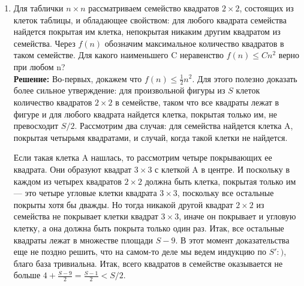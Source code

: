 \documentclass[a4paper,12pt]{article}
\begin{document}
\begin{enumerate}[label=\textbf{Задача \arabic*.}]
Что же нам дает равенство $3 = 3^2 + 1 \pmod{7}$? Просится от обоих частей взять функцию $f$, а затем воспользоваться условием задачи. Имеем: $f(3) = f((3^2+1) \pmod{7}) = (f(3)^2+1) \pmod{11}$. Чтобы подчеркнуть полученное, обозначим $f(3) = y$ и выбросим среднюю часть: $y = (y^2 + 1) \pmod{11}$. Отсюда следует $y^2 - y + 1 \equiv 0$ (в этом абзаце все сравнимости по модулю 11), отметим что это именно следствие а не равносильность. Выясним, имеет ли сравнимость решения, действуя стандартно $y \equiv \frac{1 \pm \sqrt{-3}}{2}$. А извлекается ли квадратиый корень из -3 по модулю 11? Заметим что $1^2 \equiv (-1)^2 \equiv 1$, $2^2 \equiv (-2)^2 \equiv 4$, $3^2 \equiv (-3)^2 \equiv 9$, $4^2 \equiv (-4)^2 \equiv 5$ и $5^2 \equiv (-5)^2 \equiv 3$. Мы перебрали все остатки, среди квадратов не нашлось -3, значит корень не извлекается, значит уравнение $y^2 - y + 1 \equiv 0$ не имеет решений.

Итак, требуемой функции $f$ не существует.

\item Для таблички $n\times n$ рассматриваем семейство квадратов $2 \times 2$, состоящих из клеток таблицы, и обладающее свойством: для любого квадрата семейства найдется покрытая им клетка, непокрытая никаким другим квадратом из семейства. Через $f(n)$ обозначим максимальное количество квадратов в таком семействе. Для какого наименьшего C неравенство $f(n)\leq C n^2$ верно при любом n? \\
\textbf{Решение:} Во-первых, докажем что $f(n) \le \frac{1}{2}n^2$. Для этого полезно доказать более сильное утверждение: для произвольной фигуры из $S$ клеток количество квадратов $2 \times 2$ в семействе, таком что все квадраты лежат в фигуре и для любого квадрата найдется клетка, покрытая только им, не превосходит $S/2$. Рассмотрим два случая: для семейства найдется клетка A, покрытая четырьмя квадратами, и случай, когда такой клетки не найдется.

Если такая клетка A нашлась, то рассмотрим четыре покрывающих ее квадрата. Они образуют квадрат $3 \times 3$ с клеткой A в центре. И поскольку в каждом из четырех квадратов $2 \times 2$ должна быть клетка, покрытая только им --- это четыре угловые клетки квадрата $3 \times 3$, поскольку все остальные покрыты хотя бы дважды. Но тогда никакой другой квадрат $2 \times 2$ из семейства не покрывает клетки квадрат $3 \times 3$, иначе он покрывает и угловую клетку, а она должна быть покрыта только один раз. Итак, все остальные квадраты лежат в множестве площади $S - 9$. В этот момент доказательства еще не поздно решить, что на самом-то деле мы ведем индукцию по $S' :)$, благо база тривиальна. Итак, всего квадратов в семействе оказывается не больше $4 + \frac{S-9}{2} = \frac{S-1}{2} < S/2$.


\end{enumerate}
\end{document}
